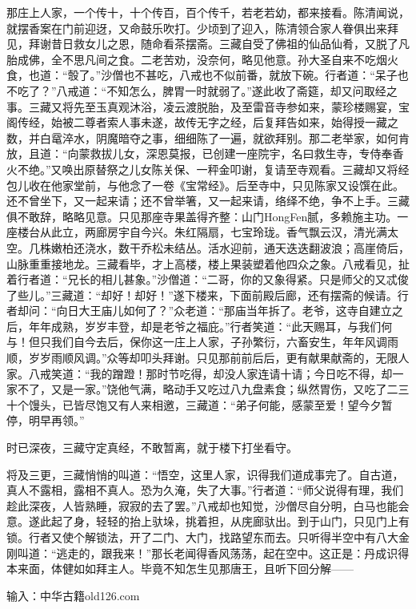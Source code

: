 \documentclass[12pt,UTF8]{ctexbook}
\begin{document}
{	那庄上人家，一个传十，十个传百，百个传千，若老若幼，都来接看。陈清闻说，就摆香案在门前迎迓，又命鼓乐吹打。少顷到了迎入，陈清领合家人眷俱出来拜见，拜谢昔日救女儿之恩，随命看茶摆斋。三藏自受了佛祖的仙品仙肴，又脱了凡胎成佛，全不思凡间之食。二老苦劝，没奈何，略见他意。孙大圣自来不吃烟火食，也道：“彀了。”沙僧也不甚吃，八戒也不似前番，就放下碗。行者道：“呆子也不吃了？”八戒道：“不知怎么，脾胃一时就弱了。”遂此收了斋筵，却又问取经之事。三藏又将先至玉真观沐浴，凌云渡脱胎，及至雷音寺参如来，蒙珍楼赐宴，宝阁传经，始被二尊者索人事未遂，故传无字之经，后复拜告如来，始得授一藏之数，并白鼋淬水，阴魔暗夺之事，细细陈了一遍，就欲拜别。那二老举家，如何肯放，且道：“向蒙救拔儿女，深恩莫报，已创建一座院宇，名曰救生寺，专侍奉香火不绝。”又唤出原替祭之儿女陈关保、一秤金叩谢，复请至寺观看。三藏却又将经包儿收在他家堂前，与他念了一卷《宝常经》。后至寺中，只见陈家又设馔在此。还不曾坐下，又一起来请；还不曾举箸，又一起来请，络绎不绝，争不上手。三藏俱不敢辞，略略见意。只见那座寺果盖得齐整：山门HongFen腻，多赖施主功。一座楼台从此立，两廊房宇自今兴。朱红隔扇，七宝玲珑。香气飘云汉，清光满太空。几株嫩柏还浇水，数干乔松未结丛。活水迎前，通天迭迭翻波浪；高崖倚后，山脉重重接地龙。三藏看毕，才上高楼，楼上果装塑着他四众之象。八戒看见，扯着行者道：“兄长的相儿甚象。”沙僧道：“二哥，你的又象得紧。只是师父的又忒俊了些儿。”三藏道：“却好！却好！”遂下楼来，下面前殿后廊，还有摆斋的候请。行者却问：“向日大王庙儿如何了？”众老道：“那庙当年拆了。老爷，这寺自建立之后，年年成熟，岁岁丰登，却是老爷之福庇。”行者笑道：“此天赐耳，与我们何与！但只我们自今去后，保你这一庄上人家，子孙繁衍，六畜安生，年年风调雨顺，岁岁雨顺风调。”众等却叩头拜谢。只见那前前后后，更有献果献斋的，无限人家。八戒笑道：“我的蹭蹬！那时节吃得，却没人家连请十请；今日吃不得，却一家不了，又是一家。”饶他气满，略动手又吃过八九盘素食；纵然胃伤，又吃了二三十个馒头，已皆尽饱又有人来相邀，三藏道：“弟子何能，感蒙至爱！望今夕暂停，明早再领。”
	
	时已深夜，三藏守定真经，不敢暂离，就于楼下打坐看守。
	
	将及三更，三藏悄悄的叫道：“悟空，这里人家，识得我们道成事完了。自古道，真人不露相，露相不真人。恐为久淹，失了大事。”行者道：“师父说得有理，我们趁此深夜，人皆熟睡，寂寂的去了罢。”八戒却也知觉，沙僧尽自分明，白马也能会意。遂此起了身，轻轻的抬上驮垛，挑着担，从庑廊驮出。到于山门，只见门上有锁。行者又使个解锁法，开了二门、大门，找路望东而去。只听得半空中有八大金刚叫道：“逃走的，跟我来！”那长老闻得香风荡荡，起在空中。这正是：丹成识得本来面，体健如如拜主人。毕竟不知怎生见那唐王，且听下回分解——
	
	输入：中华古籍old126.com
	
}
\end{document}

